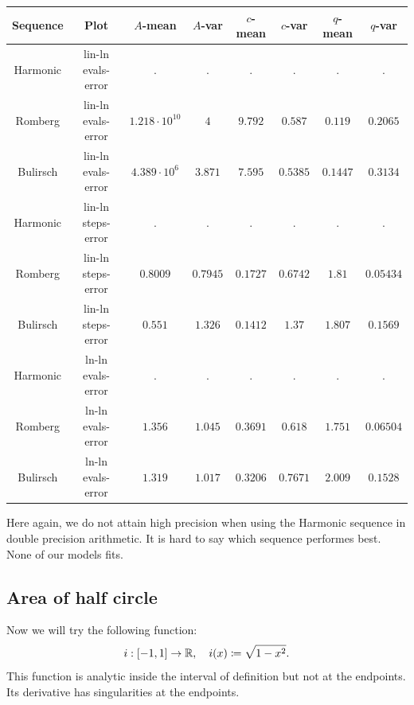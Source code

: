 \begin{table}[H]
    \centering
    \small
    \begin{tabular}{c|c||c|c|c|c|c	|c}
Sequence & Plot & \(A\)-mean & \(A\)-var & \(c\)-mean & \(c\)-var & \(q\)-mean & \(q\)-var\\\hline
Harmonic & lin-ln evals-error & . & . & . & . & . & . \\
Romberg & lin-ln evals-error & \(1.218\cdot 10^{10}\) & \(4\) & \(9.792\) & \(0.587\) & \(0.119\) & \(0.2065\) \\
Bulirsch & lin-ln evals-error & \(4.389\cdot 10^{6}\) & \(3.871\) & \(7.595\) & \(0.5385\) & \(0.1447\) & \(0.3134\) \\
Harmonic & lin-ln steps-error & . & . & . & . & . & . \\
Romberg & lin-ln steps-error & \(0.8009\) & \(0.7945\) & \(0.1727\) & \(0.6742\) & \(1.81\) & \(0.05434\) \\
Bulirsch & lin-ln steps-error & \(0.551\) & \(1.326\) & \(0.1412\) & \(1.37\) & \(1.807\) & \(0.1569\) \\
Harmonic & ln-ln evals-error & . & . & . & . & . & . \\
Romberg & ln-ln evals-error & \(1.356\) & \(1.045\) & \(0.3691\) & \(0.618\) & \(1.751\) & \(0.06504\) \\
Bulirsch & ln-ln evals-error & \(1.319\) & \(1.017\) & \(0.3206\) & \(0.7671\) & \(2.009\) & \(0.1528\) \\
    \end{tabular}
    \label{tab:my_label}
\end{table}

Here again, we do not attain high precision when using the Harmonic sequence in double precision arithmetic. It is hard to say which sequence performes best. None of our models fits.

\subsection{Area of half circle}

Now we will try the following function:
\[
i: [-1, 1] \rightarrow \mathbb{R}, \quad i(x)\coloneqq \sqrt{1-x^2}.
\]
This function is analytic inside the interval of definition but not at the endpoints. Its derivative has singularities at the endpoints.

